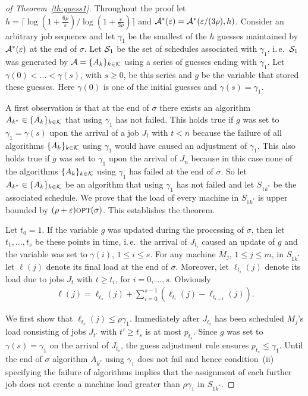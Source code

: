 \documentclass{llncs}
\newcommand{\OPT}{\text{{\sc opt}}}
\newcommand{\opt}{\OPT}
\newcommand{\eps}{\varepsilon}
\begin{document}
\begin{proof}[of Theorem~\ref{th:guess1}]
Throughout the proof let $h = \lceil \log (1+ \frac{6\rho}{\eps}) / \log(1+\frac{\eps}{3\rho})\rceil$ and
${\cal A^*}(\eps) = {\cal A^*}(\eps/(3\rho),h)$. Consider an arbitrary job sequence and let $\gamma_1$ 
be the smallest of the $h$ guesses maintained by ${\cal A^*}(\eps)$ at the end of $\sigma$. Let
${\cal S}_1$ be the set of schedules associated with $\gamma_1$, i.\,e.\ ${\cal S}_1$ was generated
by ${\cal A}= \{A_k\}_{k\in {\cal K}}$ using a series of guesses ending with $\gamma_1$. Let
$\gamma(0) < \ldots < \gamma(s)$, with $s\geq 0$, be this series and $g$ be the variable
that stored these guesses. Here $\gamma(0)$ is one of the initial guesses and $\gamma(s)= \gamma_1$. 

A first observation is that at the end of $\sigma$ there exists an algorithm $A_{k^*}\in \{A_k\}_{k\in {\cal K}}$
that using $\gamma_1$ has not failed. This holds true if $g$ was set to $\gamma_1 = \gamma(s)$ upon
the arrival of a job $J_t$ with $t<n$ because the failure of all algorithms $\{A_k\}_{k\in {\cal K}}$
using $\gamma_1$ would have caused an adjustment of $\gamma_1$. This also holds true if $g$ was set to 
$\gamma_1$ upon the arrival of $J_n$ because in this case none of the algorithms $\{A_k\}_{k\in {\cal K}}$
using $\gamma_1$ has failed at the end of $\sigma$. So let $A_{k^*}\in \{A_k\}_{k\in {\cal K}}$ be
an algorithm that using $\gamma_1$ has not failed and let $S_{1k^*}$ be the associated schedule. 
We prove that the load of every machine in $S_{1k^*}$ is upper bounded by $(\rho+\eps)\opt(\sigma)$. 
This establishes the theorem.

Let $t_0=1$. If the variable $g$ was updated during the processing of $\sigma$, then let $t_1, \ldots, t_s$
be these points in time, i.\,e.\ the arrival of $J_{t_i}$ caused an update of $g$ and the variable was
set to $\gamma(i)$, $1\leq i \leq s$. For any machine $M_j$, $1\leq j \leq m$, in
$S_{1k^*}$ let $\ell(j)$ denote its final load at the end of $\sigma$. Moreover, let $\ell_{t_i}(j)$ 
denote its load due to jobs $J_t$ with $t\geq t_i$, for $i=0, \ldots, s$. Obviously
\begin{align}\label{eq:b1}
 \ell(j) =  \ell_{t_s}(j) +\sum_{i=0}^{s-1} \left ( \ell_{t_{i}}(j) - \ell_{t_{i+1}}(j) \right ).
\end{align}

We first show that $\ell_{t_s}(j) \leq \rho\gamma_1$. Immediately after $J_{t_s}$ has been scheduled
$M_j$'s load consisting of jobs $J_{t'}$ with $t'\geq t_s$ is at most $p_{t_s}$. Since $g$ was set to
$\gamma(s) = \gamma_1$ on the arrival of $J_{t_s}$, the guess adjustment rule ensures $p_{t_s} \leq \gamma_1$.
Until the end of $\sigma$ algorithm $A_{k^*}$ using $\gamma_1$ does not fail and hence condition~(ii)
specifying the failure of algorithms implies that the assignment of each further job does not create
a machine load greater than $\rho\gamma_1$ in $S_{1k^*}$. 


\end{proof}
\end{document}
